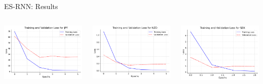 \documentclass[aspectratio=169, 12pt]{beamer}
\begin{document}
\begin{frame}[allowframebreaks]{ES-RNN: Results}
\begin{columns}
    \begin{column}{0.25\textwidth}
        \includegraphics[width=\linewidth]{plots/JPY_loss_plot.png}
    \end{column}
    \begin{column}{0.25\textwidth}
        \includegraphics[width=\linewidth]{plots/NZD_loss_plot.png}
    \end{column}
    \begin{column}{0.25\textwidth}
        \includegraphics[width=\linewidth]{plots/SEK_loss_plot.png}

\end{column}
\end{columns}
\end{frame}
\end{document}
